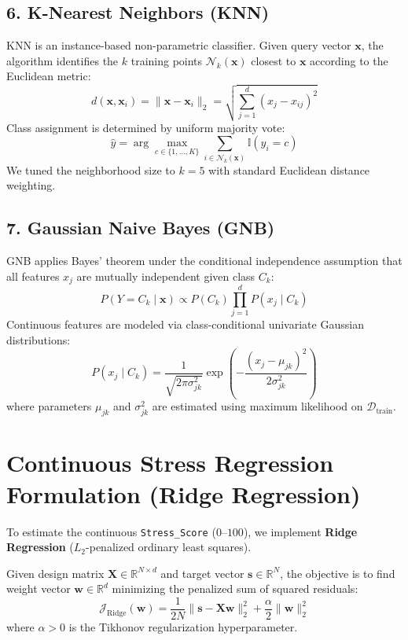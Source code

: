 \documentclass[12pt,a4paper,oneside]{report}
\begin{document}
\subsection{6. K-Nearest Neighbors (KNN)}
KNN is an instance-based non-parametric classifier. Given query vector $\mathbf{x}$, the algorithm identifies the $k$ training points $\mathcal{N}_k(\mathbf{x})$ closest to $\mathbf{x}$ according to the Euclidean metric:
\begin{equation}
    d(\mathbf{x}, \mathbf{x}_i) = \|\mathbf{x} - \mathbf{x}_i\|_2 = \sqrt{\sum_{j=1}^d (x_j - x_{ij})^2}
\end{equation}
Class assignment is determined by uniform majority vote:
\begin{equation}
    \hat{y} = \arg\max_{c \in \{1, \dots, K\}} \sum_{i \in \mathcal{N}_k(\mathbf{x})} \mathbb{I}(y_i = c)
\end{equation}
We tuned the neighborhood size to $k = 5$ with standard Euclidean distance weighting.

\subsection{7. Gaussian Naive Bayes (GNB)}
GNB applies Bayes' theorem under the conditional independence assumption that all features $x_j$ are mutually independent given class $C_k$:
\begin{equation}
    P(Y = C_k \mid \mathbf{x}) \propto P(C_k) \prod_{j=1}^d P(x_j \mid C_k)
\end{equation}
Continuous features are modeled via class-conditional univariate Gaussian distributions:
\begin{equation}
    P(x_j \mid C_k) = \frac{1}{\sqrt{2\pi \sigma_{jk}^2}} \exp\left( -\frac{(x_j - \mu_{jk})^2}{2\sigma_{jk}^2} \right)
\end{equation}
where parameters $\mu_{jk}$ and $\sigma_{jk}^2$ are estimated using maximum likelihood on $\mathcal{D}_{\text{train}}$.

\section{Continuous Stress Regression Formulation (Ridge Regression)}
\label{sec:regression_formulation}
To estimate the continuous \texttt{Stress\_Score} ($0$--$100$), we implement \textbf{Ridge Regression} ($L_2$-penalized ordinary least squares). 

Given design matrix $\mathbf{X} \in \mathbb{R}^{N \times d}$ and target vector $\mathbf{s} \in \mathbb{R}^N$, the objective is to find weight vector $\mathbf{w} \in \mathbb{R}^d$ minimizing the penalized sum of squared residuals:
\begin{equation}
    \mathcal{J}_{\text{Ridge}}(\mathbf{w}) = \frac{1}{2N} \|\mathbf{s} - \mathbf{X}\mathbf{w}\|_2^2 + \frac{\alpha}{2} \|\mathbf{w}\|_2^2
    \label{eq:ridge_objective}
\end{equation}
where $\alpha > 0$ is the Tikhonov regularization hyperparameter.
\end{document}
